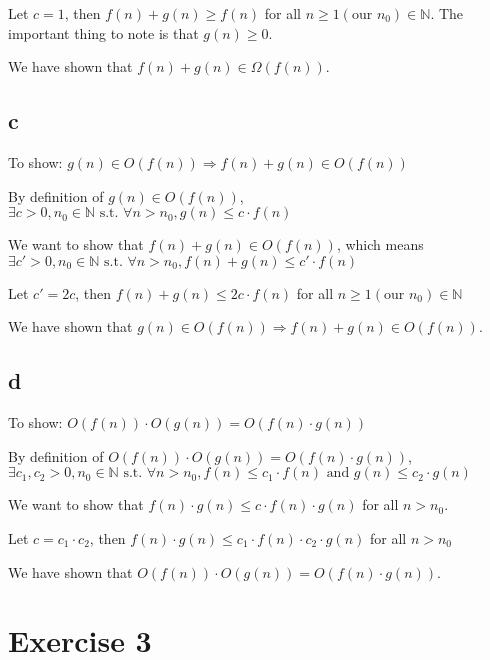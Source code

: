 \documentclass[a4paper,12pt]{article}
\begin{document}
Let $c = 1$, then $f(n) + g(n) \geq f(n)$ for all $n \geq 1 (\text{our } n_0)\in \mathbb{N}$. The important thing to note is that $g(n) \geq 0$.

We have shown that $f(n) + g(n) \in \Omega(f(n))$.

\subsection{c}

To show: $g(n) \in O(f(n)) \Rightarrow f(n) + g(n) \in O(f(n))$

By definition of $g(n) \in O(f(n))$, $\exists c > 0, n_0 \in \mathbb{N} \text{ s.t. } \forall n > n_0, g(n) \leq c \cdot f(n)$

We want to show that $f(n) + g(n) \in O(f(n))$, which means $\exists c' > 0, n_0 \in \mathbb{N} \text{ s.t. } \forall n > n_0, f(n) + g(n) \leq c' \cdot f(n)$

Let $c' = 2c$, then $f(n) + g(n) \leq 2c \cdot f(n)$ for all $n \geq 1 (\text{our } n_0)\in \mathbb{N}$

We have shown that $g(n) \in O(f(n)) \Rightarrow f(n) + g(n) \in O(f(n))$.

\subsection{d}

To show: $O(f(n)) \cdot O(g(n)) = O(f(n) \cdot g(n))$

By definition of $O(f(n)) \cdot O(g(n)) = O(f(n) \cdot g(n))$, $\exists c_1, c_2 > 0, n_0 \in \mathbb{N} \text{ s.t. } \forall n > n_0, f(n) \leq c_1 \cdot f(n) \text{ and } g(n) \leq c_2 \cdot g(n)$

We want to show that $f(n) \cdot g(n) \leq c \cdot f(n) \cdot g(n)$ for all $n > n_0$.

Let $c = c_1 \cdot c_2$, then $f(n) \cdot g(n) \leq c_1 \cdot f(n) \cdot c_2 \cdot g(n)$ for all $n > n_0$

We have shown that $O(f(n)) \cdot O(g(n)) = O(f(n) \cdot g(n))$.

\section{Exercise 3}

\end{document}
